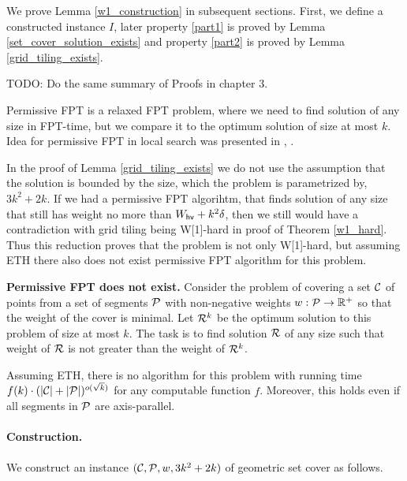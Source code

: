 We prove Lemma \ref{w1_construction} in subsequent sections.
First, we define a constructed instance $I$, later property
\ref{part1} is proved by Lemma \ref{set_cover_solution_exists}
and property \ref{part2} is proved by Lemma \ref{grid_tiling_exists}.

TODO: Do the same summary of Proofs in chapter 3.


Permissive FPT is a relaxed FPT problem, where 
we need to find solution of any size in FPT-time,
but we compare it to the optimum solution of size at most $k$.
Idea for permissive FPT in local search was presented in \cite{permissive_problem1}, \cite{permissive_problem2}.


In the proof of Lemma \ref{grid_tiling_exists}
we do not use the assumption that
the solution is bounded by the size,
which the problem is parametrized by, $3k^2+2k$.
If we had a permissive FPT algorihtm,
that finds solution of any size that still
has weight no more than $W_{\mathsf{hv}}+k^2\delta$,
then we still would have a contradiction with grid tiling being W[1]-hard
in proof of Theorem \ref{w1_hard}.
Thus this reduction
proves that the problem is not only W[1]-hard, but assuming ETH 
there also does not exist permissive FPT algorithm for this problem.

\begin{tw}
\textbf{Permissive FPT does not exist.}
	Consider the problem of covering a set $\mathcal{C}$ of points
	from a set of segments $\mathcal{P}$ 
	with non-negative weights $w : \mathcal{P} \rightarrow \mathbb{R^+}$
	so that the weight of the cover is minimal.
	Let $\mathcal{R}^k$ be the
	optimum solution to this problem of size at most $k$.
	The task is to find solution $\mathcal{R}$ of any size
	such that weight of $\mathcal{R}$ is not greater than the weight of $\mathcal{R}^k$.
	
	Assuming ETH, there is no algorithm for this
	problem with running time
	$f(k)\cdot(|\mathcal{C}| + |\mathcal{P}|)^{o(\sqrt{k})}$
	for any computable function $f$.
	Moreover, this holds even if all segments in $\mathcal{P}$
	are axis-parallel.
\end{tw}

\paragraph{Construction.}
\newcommand{\order}{\mathsf{order}}
\newcommand{\matchv}{\mathsf{match}_v}
\newcommand{\matchh}{\mathsf{match}_h}

We construct an instance $(\mathcal{C}, \mathcal{P}, w, 3k^2+2k)$ of geometric set cover as follows.

